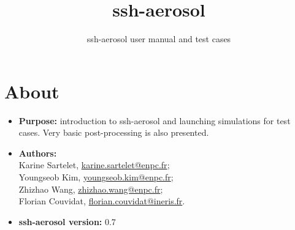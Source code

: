 \documentclass[a4paper,11pt]{article}
\title{ssh-aerosol}
\date{}
\author{ssh-aerosol user manual and test cases}
\begin{document}
\maketitle

\section*{About}

\begin{itemize}
\item[] {\bf Purpose:} introduction to ssh-aerosol and launching simulations
  for test cases. Very basic post-processing is also
  presented. 
\item[] {\bf Authors:} \\Karine Sartelet, \url{karine.sartelet@enpc.fr};\\
  Youngseob Kim, \url{youngseob.kim@enpc.fr};\\ Zhizhao Wang,
  \url{zhizhao.wang@enpc.fr}; \\Florian Couvidat, \url{florian.couvidat@ineris.fr}.
\item[] {\bf ssh-aerosol version:} 0.7
\end{itemize}

\tableofcontents

\newpage
\end{document}
